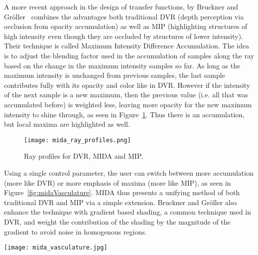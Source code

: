 A more recent approach in the design of transfer functions, by Bruckner and Gr{\"o}ller~\cite{bruckner2009instant} combines the advantages both traditional DVR (depth perception via occlusion from opacity accumulation) as well as MIP (highlighting structures of high intensity even though they are occluded by structures of lower intensity). Their technique is called Maximum Intensity Difference Accumulation. The idea is to adjust the blending factor used in the accumulation of samples along the ray based on the change in the maximum intensity samples so far. As long as the maximum intensity is unchanged from previous samples, the last sample contributes fully with its opacity and color like in DVR. However if the intensity of the next sample is a new maximum, then the previous value (i.e. all that was accumulated before) is weighted less, leaving more opacity for the new maximum intensity to shine through, as seen in Figure~\ref{fig:midaRayProfiles}. Thus there is an accumulation, but local maxima are highlighted as well. 
\begin{figure}[htb]
  \centering
  \texttt{[image: mida\_ray\_profiles.png]}
  \caption{\label{fig:midaRayProfiles} Ray profiles for DVR, MIDA and MIP.}
\end{figure}
Using a single control parameter, the user can switch between more accumulation (more like DVR) or more emphasis of maxima (more like MIP), as seen in Figure~\ref{fig:midaVasculature}. MIDA thus presents a unifying method of both traditional DVR and MIP via a simple extension.
Bruckner and Gr{\"o}ller also enhance the technique with gradient based shading, a common technique used in DVR, and weight the contribution of the shading by the magnitude of the gradient to avoid noise in homogenous regions.

\begin{figure*}[htb]
  \centering
  \texttt{[image: mida\_vasculature.jpg]}
  \caption{\label{fig:midaVasculature} Maximum Intensity Difference Accumulation provides a technique that unifies both traditional DVR and MIP. Using a single control parameter, the user can switch between more accumulation (more like DVR) or more emphasis of maxima (more like MIP).}
\end{figure*}

